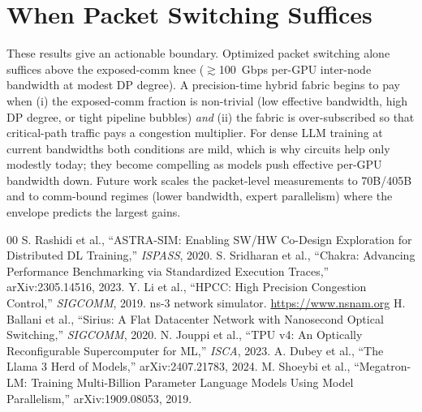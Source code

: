 \documentclass[conference]{IEEEtran}
\begin{document}
\section{When Packet Switching Suffices}
These results give an actionable boundary. Optimized packet switching alone suffices above the
exposed-comm knee ($\gtrsim$100~Gbps per-GPU inter-node bandwidth at modest DP degree). A
precision-time hybrid fabric begins to pay when (i) the exposed-comm fraction is non-trivial
(low effective bandwidth, high DP degree, or tight pipeline bubbles) \emph{and} (ii) the fabric
is over-subscribed so that critical-path traffic pays a congestion multiplier. For dense LLM
training at current bandwidths both conditions are mild, which is why circuits help only
modestly today; they become compelling as models push effective per-GPU bandwidth down. Future
work scales the packet-level measurements to 70B/405B and to comm-bound regimes (lower
bandwidth, expert parallelism) where the envelope predicts the largest gains.

\begin{thebibliography}{00}
 S. Rashidi et al., ``ASTRA-SIM: Enabling SW/HW Co-Design Exploration for
Distributed DL Training,'' \emph{ISPASS}, 2020.
 S. Sridharan et al., ``Chakra: Advancing Performance Benchmarking via
Standardized Execution Traces,'' arXiv:2305.14516, 2023.
 Y. Li et al., ``HPCC: High Precision Congestion Control,'' \emph{SIGCOMM}, 2019.
 ns-3 network simulator. \url{https://www.nsnam.org}
 H. Ballani et al., ``Sirius: A Flat Datacenter Network with Nanosecond Optical
Switching,'' \emph{SIGCOMM}, 2020.
 N. Jouppi et al., ``TPU v4: An Optically Reconfigurable Supercomputer for ML,''
\emph{ISCA}, 2023.
 A. Dubey et al., ``The Llama 3 Herd of Models,'' arXiv:2407.21783, 2024.
 M. Shoeybi et al., ``Megatron-LM: Training Multi-Billion Parameter Language
Models Using Model Parallelism,'' arXiv:1909.08053, 2019.
\end{thebibliography}
\end{document}

